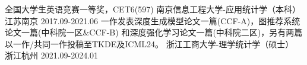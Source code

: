 \begin{educventries}
\educventry
{全国大学生英语竞赛一等奖，CET6(597)}
{南京信息工程大学-应用统计学（本科）}
{江苏南京}
{2017.09-2021.06}
\educventry
{一作发表深度生成模型论文一篇(CCF-A)，图推荐系统论文一篇(中科院一区\&CCF-B)
和深度强化学习论文一篇(中科院二区)，另有两篇以一作/共同一作投稿至TKDE及ICML24。}
{浙江工商大学-理学统计学（硕士）}
{浙江杭州}
{2021.09-2024.01}

\end{educventries}
